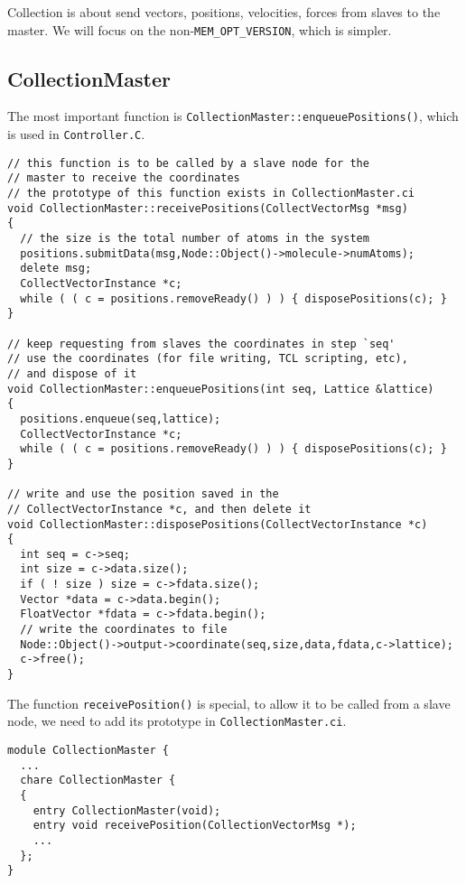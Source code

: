 \documentclass{article}
\begin{document}
Collection is about send vectors, positions, velocities, forces
from slaves to the master.
%
We will focus on the non-\texttt{MEM\_OPT\_VERSION}, which is simpler.

\subsection{CollectionMaster}

The most important function is
\texttt{CollectionMaster::enqueuePositions()},
which is used in \texttt{Controller.C}.

\begin{lstlisting}
// this function is to be called by a slave node for the
// master to receive the coordinates
// the prototype of this function exists in CollectionMaster.ci
void CollectionMaster::receivePositions(CollectVectorMsg *msg)
{
  // the size is the total number of atoms in the system
  positions.submitData(msg,Node::Object()->molecule->numAtoms);
  delete msg;
  CollectVectorInstance *c;
  while ( ( c = positions.removeReady() ) ) { disposePositions(c); }
}

// keep requesting from slaves the coordinates in step `seq'
// use the coordinates (for file writing, TCL scripting, etc),
// and dispose of it
void CollectionMaster::enqueuePositions(int seq, Lattice &lattice)
{
  positions.enqueue(seq,lattice);
  CollectVectorInstance *c;
  while ( ( c = positions.removeReady() ) ) { disposePositions(c); }
}

// write and use the position saved in the
// CollectVectorInstance *c, and then delete it
void CollectionMaster::disposePositions(CollectVectorInstance *c)
{
  int seq = c->seq;
  int size = c->data.size();
  if ( ! size ) size = c->fdata.size();
  Vector *data = c->data.begin();
  FloatVector *fdata = c->fdata.begin();
  // write the coordinates to file
  Node::Object()->output->coordinate(seq,size,data,fdata,c->lattice);
  c->free();
}
\end{lstlisting}

The function \texttt{receivePosition()} is special,
to allow it to be called from a slave node,
we need to add its prototype in \texttt{CollectionMaster.ci}.

\begin{lstlisting}
module CollectionMaster {
  ...
  chare CollectionMaster {
  {
    entry CollectionMaster(void);
    entry void receivePosition(CollectionVectorMsg *);
    ...
  };
}
\end{lstlisting}
\end{document}
